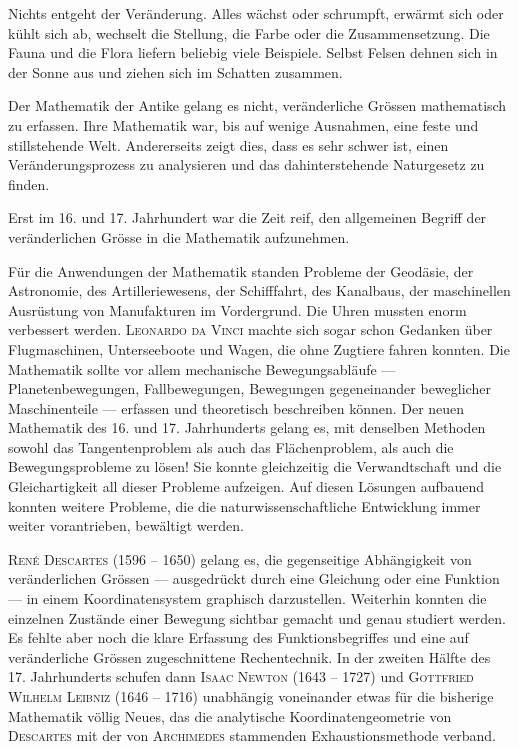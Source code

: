 \documentclass[%
11pt,%
twoside,%
titlepage,%
german,%
headsepline%
]{scrartcl}
\theoremstyle{definition}
\theoremstyle{plain}
\begin{document}
Nichts entgeht der Veränderung. Alles wächst oder schrumpft, erwärmt sich oder kühlt sich ab, wechselt die Stellung, die Farbe oder die Zusammensetzung. Die Fauna und die Flora liefern beliebig viele Beispiele. Selbst Felsen dehnen sich in der Sonne aus und ziehen sich im Schatten zusammen.

Der Mathematik der Antike gelang es nicht, veränderliche Grössen mathematisch zu erfassen. Ihre Mathematik war, bis auf wenige Ausnahmen, eine feste und stillstehende Welt. Andererseits zeigt dies, dass es sehr schwer ist, einen Veränderungsprozess zu analysieren und das dahinterstehende Naturgesetz zu finden.

Erst im 16. und 17. Jahrhundert war die Zeit reif, den allgemeinen Begriff der veränderlichen Grösse in die Mathematik aufzunehmen.

Für die Anwendungen der Mathematik standen Probleme der Geodäsie, der Astronomie, des Artilleriewesens, der Schifffahrt, des Kanalbaus, der maschinellen Ausrüstung von Manufakturen im Vordergrund. Die Uhren mussten enorm verbessert werden. \textsc{Leonardo da Vinci} machte sich sogar schon Gedanken über Flugmaschinen, Unterseeboote und Wagen, die ohne Zugtiere fahren konnten.
Die Mathematik sollte vor allem mechanische Bewegungsabläufe --- Planetenbewegungen, Fallbewegungen, Bewegungen gegeneinander beweglicher Maschinenteile --- erfassen und theoretisch beschreiben können.
Der neuen Mathematik des 16. und 17. Jahrhunderts gelang es, mit denselben Methoden sowohl das Tangentenproblem als auch das Flächenproblem, als auch die Bewegungsprobleme zu lösen! Sie konnte gleichzeitig die Verwandtschaft und die Gleichartigkeit all dieser Probleme aufzeigen. Auf diesen Lösungen aufbauend konnten weitere Probleme, die die naturwissenschaftliche Entwicklung immer weiter vorantrieben, bewältigt werden.

\textsc{Ren\'e Descartes} (1596 -- 1650) gelang es, die gegenseitige Abhängigkeit von veränderlichen Grössen --- ausgedrückt durch eine Gleichung oder eine Funk\-tion --- in einem Koordinatensystem graphisch darzustellen.
Weiterhin konnten die einzelnen Zustände einer Bewegung sichtbar gemacht und genau studiert werden.
Es fehlte aber noch die klare Erfassung des Funk\-tions\-begriffes und eine auf veränderliche Grössen zugeschnittene Rechentechnik.
In der zweiten Hälfte des 17. Jahrhunderts schufen dann \textsc{Isaac Newton} (1643 -- 1727) und \textsc{Gottfried Wilhelm Leibniz} (1646 -- 1716) unabhängig voneinander etwas für die bisherige Mathematik völlig Neues, das die analytische Koordinatengeometrie von \textsc{Descartes} mit der von \textsc{Archimedes} stammenden Exhaustionsmethode verband.
\end{document}
